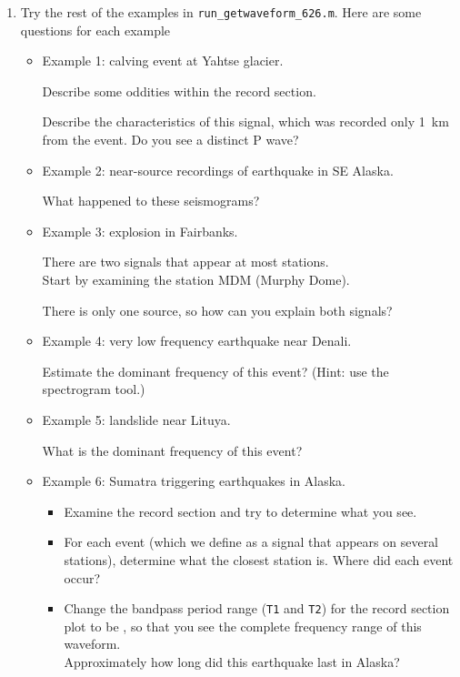 \documentclass[11pt,titlepage,fleqn]{article}
\begin{document}
\begin{enumerate}
\item Try the rest of the examples in \verb+run_getwaveform_626.m+. Here are some questions for each example
%
\begin{itemize}
\item Example 1: calving event at Yahtse glacier. 

Describe some oddities within the record section.

Describe the characteristics of this signal, which was recorded only 1~km from the event. Do you see a distinct P wave?

\item Example 2: near-source recordings of  earthquake in SE Alaska. 

What happened to these seismograms?

\item Example 3: explosion in Fairbanks. 

There are two signals that appear at most stations. \\
Start by examining the station MDM (Murphy Dome).

There is only one source, so how can you explain both signals?

\item Example 4: very low frequency earthquake near Denali. 

Estimate the dominant frequency of this event? (Hint: use the spectrogram tool.)

\item Example 5: landslide near Lituya. 

What is the dominant frequency of this event?

\item Example 6: Sumatra  triggering earthquakes in Alaska. 
%
\begin{itemize}
\item Examine the record section and try to determine what you see.
\item For each event (which we define as a signal that appears on several stations), determine what the closest station is. Where did each event occur?
\item Change the bandpass period range (\verb+T1+ and \verb+T2+) for the record section plot to be , so that you see the complete frequency range of this waveform. \\
Approximately how long did this earthquake last in Alaska?
\end{itemize}


\end{itemize}
\end{enumerate}
\end{document}
